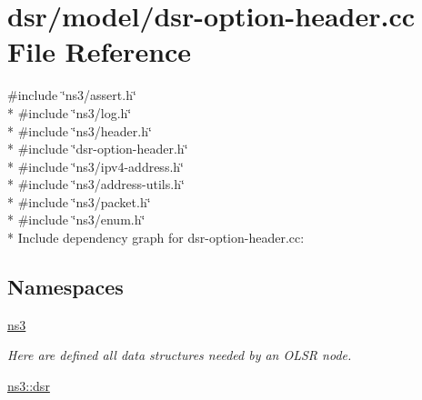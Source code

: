 \hypertarget{dsr-option-header_8cc}{}\section{dsr/model/dsr-\/option-\/header.cc File Reference}
\label{dsr-option-header_8cc}
{\ttfamily \#include \char`\"{}ns3/assert.\+h\char`\"{}}\\*
{\ttfamily \#include \char`\"{}ns3/log.\+h\char`\"{}}\\*
{\ttfamily \#include \char`\"{}ns3/header.\+h\char`\"{}}\\*
{\ttfamily \#include \char`\"{}dsr-\/option-\/header.\+h\char`\"{}}\\*
{\ttfamily \#include \char`\"{}ns3/ipv4-\/address.\+h\char`\"{}}\\*
{\ttfamily \#include \char`\"{}ns3/address-\/utils.\+h\char`\"{}}\\*
{\ttfamily \#include \char`\"{}ns3/packet.\+h\char`\"{}}\\*
{\ttfamily \#include \char`\"{}ns3/enum.\+h\char`\"{}}\\*
Include dependency graph for dsr-\/option-\/header.cc\+:
\subsection*{Namespaces}
\begin{DoxyCompactItemize}
\item 
 \hyperlink{namespacens3}{ns3}
\begin{DoxyCompactList}\small\item\em Here are defined all data structures needed by an O\+L\+SR node. \end{DoxyCompactList}\item 
 \hyperlink{namespacens3_1_1dsr}{ns3\+::dsr}
\end{DoxyCompactItemize}
